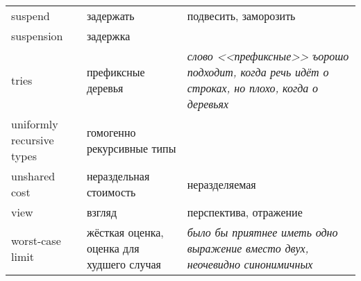 \documentclass{article}
\begin{document}
\begin{tabular}{p{3cm}|p{4cm}|p{5cm}}
suspend & задержать & подвесить, заморозить \\
suspension & задержка \\
tries & префиксные деревья & \textit{слово <<префиксные>> ъорошо
  подходит, когда речь идёт о строках, но плохо, когда о деревьях} \\
uniformly recursive types & гомогенно рекурсивные типы \\
unshared cost & нераздельная стоимость & неразделяемая \\
view & взгляд & перспектива, отражение \\
worst-case limit & жёсткая оценка, оценка для худшего случая &
\textit{было бы приятнее иметь одно выражение вместо двух, неочевидно
  синонимичных} \\

\end{tabular}
\end{document}
